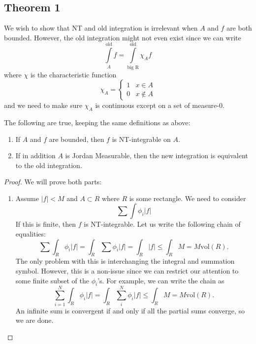 \documentclass{article}
\numberwithin{equation}{section}
\begin{document}
\subsection{Theorem 1}
We wish to show that NT and old integration is irrelevant when $A$ and $f$ are both bounded. However, the old integration might not even exist since we can write
\begin{equation}
    \int\limits_A^{\text{old}} f = \int\limits_{\text{big R}}^{\text{old}} \chi_A f
\end{equation} 
where $\chi$ is the characteristic function
\begin{equation}
    \chi_A = \begin{cases}
        1 & x\in A \\ 
        0 & x\notin A
    \end{cases}
\end{equation}
and we need to make sure $\chi_A$ is continuous except on a set of measure-$0$.
\begin{theorem}
    The following are true, keeping the same definitions as above:
    \begin{enumerate}
        \item If $A$ and $f$ are bounded, then $f$ is NT-integrable on $A$.
        \item If in addition $A$ is Jordan Measurable, then
        the new integration is equivalent to the old integration.
    \end{enumerate}
\end{theorem}
\begin{proof}
    We will prove both parts:
    \begin{enumerate}
        \item Assume $|f| < M$ and $A \subset R$ where $R$ is some rectangle. We need to consider
        \begin{equation}
            \sum \int \phi_i |f|
        \end{equation}
        If this is finite, then $f$ is NT-integrable. Let us write the following chain of equalities:
        \begin{equation}
            \sum \int_R \phi_i |f| = \int_R \sum \phi_i |f| = \int_R |f| \le \int_R M =  M\text{vol}(R).
        \end{equation}
        The only problem with this is interchanging the integral and summation symbol. However, this is a non-issue since we can restrict our attention to some finite subset of the $\phi_i$'s. For example, we can write the chain as 
        \begin{equation}
            \sum_{i=1}^N \int_R \phi_i |f| = \int_R \sum_{i}^N \phi_i |f| \le \int_R M =  M\text{vol}(R).
        \end{equation}
        An infinite sum is convergent if and only if all the partial sums converge, so we are done.
    \end{enumerate}
\end{proof}
\end{document}
